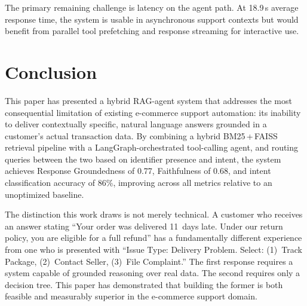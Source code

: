\documentclass[conference]{IEEEtran}
\begin{document}
The primary remaining challenge is latency on the agent path. At 18.9\,s average
response time, the system is usable in asynchronous support contexts but would
benefit from parallel tool prefetching and response streaming for interactive use.

\section{Conclusion}

This paper has presented a hybrid RAG-agent system that addresses the most consequential
limitation of existing e-commerce support automation: its inability to deliver
contextually specific, natural language answers grounded in a customer's actual
transaction data. By combining a hybrid BM25\,+\,FAISS retrieval pipeline with a
LangGraph-orchestrated tool-calling agent, and routing queries between the two
based on identifier presence and intent, the system achieves Response
Groundedness of 0.77, Faithfulness of 0.68, and intent classification accuracy of
86\%, improving across all metrics relative to an unoptimized baseline.

The distinction this work draws is not merely technical. A customer who receives an
answer stating ``Your order was delivered 11~days late. Under our return policy,
you are eligible for a full refund'' has a fundamentally different experience from
one who is presented with ``Issue Type: Delivery Problem. Select: (1)~Track
Package, (2)~Contact Seller, (3)~File Complaint.'' The first response requires a
system capable of grounded reasoning over real data. The second requires only a
decision tree. This paper has demonstrated that building the former is both
feasible and measurably superior in the e-commerce support domain.
\end{document}
